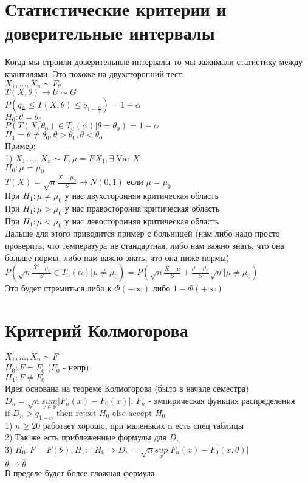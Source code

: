 \documentclass{article}
\newcommand\0{\mathbb{0}}
\DeclareMathOperator{\Var}{Var}
\newcommand\1{\mathbb{1}}
\newcommand{\Rto}{\Rightarrow}
\begin{document}
\section{Статистические критерии и доверительные интервалы}
Когда мы строили доверительные интервалы то мы зажимали статистику между квантилями. Это похоже на двухсторонний тест.\\
$X_1, \dots, X_n \sim F_{\theta}$\\
$T(X, \theta) \to U \sim G$\\
$P(q_{\frac{\alpha}{2}} \leq T(X, \theta) \leq q_{1 - \frac{\alpha}{2}}) = 1 - \alpha$\\
$H_0 : \theta = \theta_0$\\
$P(T(X, \theta_0) \in T_0(\alpha) | \theta = \theta_0) = 1 - \alpha$\\
$H_1 = \theta \neq \theta_0, \theta > \theta_0, \theta < \theta_0$\\
Пример:\\
1) $X_1, \dots, X_n \sim F, \mu = EX_1, \exists \Var X$\\
$H_0: \mu = \mu_0$\\
$T(X) = \sqrt{n} \frac{\overline{X} - \mu_0}{S} \to N(0, 1)$ если $\mu = \mu_0$\\
При $H_1: \mu \neq \mu_0$ у нас двухсторонняя критическая область\\
При $H_1: \mu > \mu_0$ у нас правостороння критическая область\\
При $H_1: \mu < \mu_0$ у нас левосторонняя критическая область\\
Дальше для этого приводится пример с больницей (нам либо надо просто проверить, что температура не стандартная, либо нам важно знать, что она больше нормы, либо нам важно знать, что она ниже нормы)\\
$P(\sqrt{n}\frac{\overline{X} - \mu_0}{S} \in T_0(\alpha) | \mu \neq \mu_0) = P(\sqrt{n}\frac{\overline{X} - \mu}{S} + \frac{\mu - \mu_0}{S}\sqrt{n} | \mu \neq \mu_0)$\\
Это будет стремиться либо к $\Phi(-\infty)$ либо $1 - \Phi(+\infty)$
\section{Критерий Колмогорова}
$X_1, \dots, X_n \sim F$\\
$H_0: F = F_0$ ($F_0$ - непр)\\
$H_1: F \neq F_0$\\
Идея основана на теореме Колмогорова (было в начале семестра)\\
$D_n = \sqrt{n}\underset{x \in \mathbb{R}}{sum}|F_n(x) - F_0(x)|$, $F_n$ - эмпирическая функция распределения\\
$\text{if }D_n > q_{1 - \alpha} \text{ then reject } H_0\text{ else accept } H_0$\\
1) $n \geq 20$ работает хорошо, при маленьких n есть спец таблицы\\
2) Так же есть приблеженные формулы для $D_n$\\
3) $H_0: F = F(\theta), H_1: \neg H_0 \Rto D_n = \sqrt{n}\underset{x}{sup}|F_n(x) - F_0(x, \theta)|$\\
$\theta \to \widehat{\theta}$\\
В пределе будет более сложная формула\\
\end{document}
